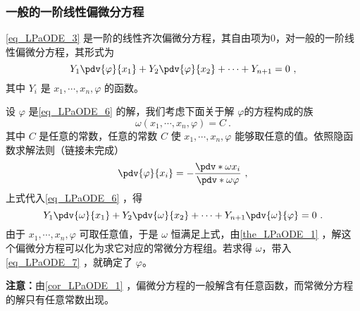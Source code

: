 \subsubsection{一般的一阶线性偏微分方程}
\autoref{eq_LPaODE_3} 是一阶的线性齐次偏微分方程，其自由项为0，对一般的一阶线性偏微分方程，其形式为
\begin{equation}\label{eq_LPaODE_6}
Y_1\pdv{\varphi}{x_1}+Y_2\pdv{\varphi}{x_2}+\cdots+Y_{n+1}=0~,
\end{equation}
其中 $Y_i$ 是 $x_1,\cdots,x_n,\varphi$ 的函数。

设 $\varphi$ 是\autoref{eq_LPaODE_6} 的解，我们考虑下面关于解 $\varphi$的方程构成的族
\begin{equation}\label{eq_LPaODE_7}
\omega(x_1,\cdots,x_n,\varphi)=C~.
\end{equation}
其中 $C$ 是任意的常数，任意的常数 $C$ 使 $x_1,\cdots,x_n,\varphi$ 能够取任意的值。依照隐函数求解法则（链接未完成）
\begin{equation}
\pdv{\varphi}{x_i}=-\frac{\pdv*{\omega}{x_i}}{\pdv*{\omega}{\varphi}}~,
\end{equation}
上式代入\autoref{eq_LPaODE_6} ，得
\begin{equation}
Y_1\pdv{\omega}{x_1}+Y_2\pdv{\omega}{x_2}+\cdots+Y_{n+1}\pdv{\omega}{\varphi}=0~.
\end{equation}
由于 $x_1,\cdots,x_n,\varphi$ 可取任意值，于是 $\omega$ 恒满足上式，由\autoref{the_LPaODE_1} ，解这个偏微分方程可以化为求它对应的常微分方程组。若求得 $\omega$，带入\autoref{eq_LPaODE_7} ，就确定了 $\varphi$。

\textbf{注意：}由\autoref{cor_LPaODE_1} ，偏微分方程的一般解含有任意函数，而常微分方程的解只有任意常数出现。
